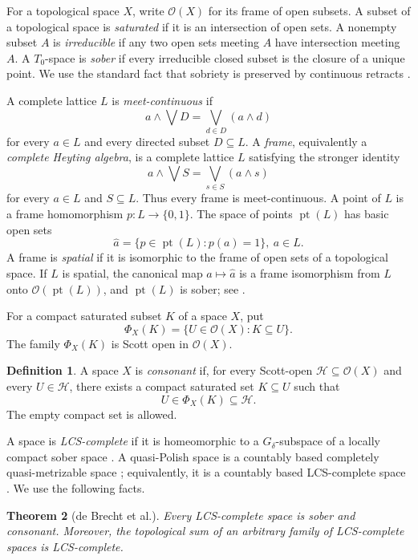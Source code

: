 \documentclass[11pt,reqno]{amsart}
\newtheorem{theorem}{Theorem}[section]
\theoremstyle{definition}
\newtheorem{definition}[theorem]{Definition}
\numberwithin{equation}{section}
\newcommand{\OO}{\mathcal O}
\newcommand{\pt}{\operatorname{pt}}
\begin{document}
For a topological space $X$, write $\OO(X)$ for its frame of open subsets.  A
subset of a topological space is \emph{saturated} if it is an intersection of open
sets. A nonempty subset $A$ is \emph{irreducible} if any two open sets
meeting $A$ have intersection meeting $A$. A $T_0$-space is
\emph{sober} if every irreducible closed subset is the closure of a
unique point. We use the standard fact that sobriety is preserved by
continuous retracts \citep{GoubaultLarrecq2013}.

A complete lattice $L$ is \emph{meet-continuous} if
\[
  a\wedge\bigvee D=\bigvee_{d\in D}(a\wedge d)
\]
for every $a\in L$ and every directed subset $D\subseteq L$.  A \emph{frame}, equivalently a \emph{complete Heyting algebra}, is a complete
lattice $L$ satisfying the stronger identity
\[
  a\wedge\bigvee S=\bigvee_{s\in S}(a\wedge s)
\]
for every $a\in L$ and $S\subseteq L$.  Thus every frame is
meet-continuous.  A point of $L$ is a frame homomorphism
$p:L\to\{0,1\}$.  The space of points $\pt(L)$ has basic open sets
\[
  \widehat a=\{p\in\pt(L):p(a)=1\},~ a\in L.
\]
A frame is \emph{spatial} if it is isomorphic to the frame of open sets
of a topological space. If $L$ is spatial, the canonical map $a\mapsto\widehat a$ is a frame
isomorphism from $L$ onto $\OO(\pt(L))$, and $\pt(L)$ is sober; see
\citep[Chapter~V]{GierzEtAl2003}.

For a compact saturated subset $K$ of a space $X$, put
\[
  \Phi_X(K)=\{U\in\OO(X):K\subseteq U\}.
\]
The family $\Phi_X(K)$ is Scott open in $\OO(X)$.

\begin{definition}\label{def:consonant}
A space $X$ is \emph{consonant} if, for every Scott-open
$\mathcal H\subseteq\OO(X)$ and every $U\in\mathcal H$, there exists a
compact saturated set $K\subseteq U$ such that
\[
  U\in\Phi_X(K)\subseteq\mathcal H.
\]
The empty compact set is allowed.
\end{definition}

A space is \emph{LCS-complete} if it is homeomorphic to a $G_\delta$-subspace
of a locally compact sober space \citep{deBrechtEtAl2019}.  A quasi-Polish
space is a countably based completely quasi-metrizable space
\citep{deBrecht2013}; equivalently, it is a countably based LCS-complete space
\citep{deBrechtEtAl2019}.  We use the following facts.

\begin{theorem}[de Brecht et al.]
\label{thm:lcs}
Every LCS-complete space is sober and consonant.  Moreover, the topological
sum of an arbitrary family of LCS-complete spaces is LCS-complete.
\end{theorem}
\end{document}
